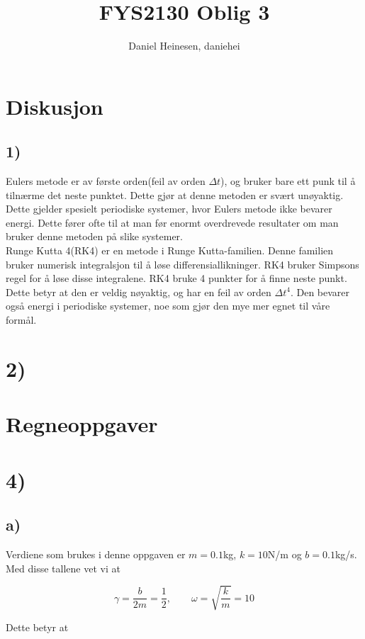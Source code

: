 \documentclass[a4paper,norsk, 10pt]{article}
\title{FYS2130 Oblig 3}
\author{Daniel Heinesen, daniehei}
\begin{document}
\maketitle

\section*{Diskusjon}

\subsection*{1)}
Eulers metode er av første orden(feil av orden $\Delta t$), og bruker bare ett punk til å tilnærme det neste punktet. Dette gjør at denne metoden er svært unøyaktig. Dette gjelder spesielt periodiske systemer, hvor Eulers metode ikke bevarer energi. Dette fører ofte til at man før enormt overdrevede resultater om man bruker denne metoden på slike systemer. \\

Runge Kutta 4(RK4) er en metode i Runge Kutta-familien. Denne familien bruker numerisk integralsjon til å løse differensiallikninger. RK4 bruker Simpsons regel for å løse disse integralene. RK4 bruke 4 punkter for å finne neste punkt. Dette betyr at den er veldig nøyaktig, og har en feil av orden $\Delta t^4$. Den bevarer også energi i periodiske systemer, noe som gjør den mye mer egnet til våre formål.

\section*{2)}


\section*{Regneoppgaver}

\section*{4)}
\subsection*{a)}
Verdiene som brukes i denne oppgaven er $m = 0.1$kg, $k = 10$N/m og $b = 0.1$kg/s. Med disse tallene vet vi at

$$
\gamma = \frac{b}{2m} = \frac{1}{2}, \qquad \omega = \sqrt{\frac{k}{m}} = 10
$$	

Dette betyr at
\end{document}
